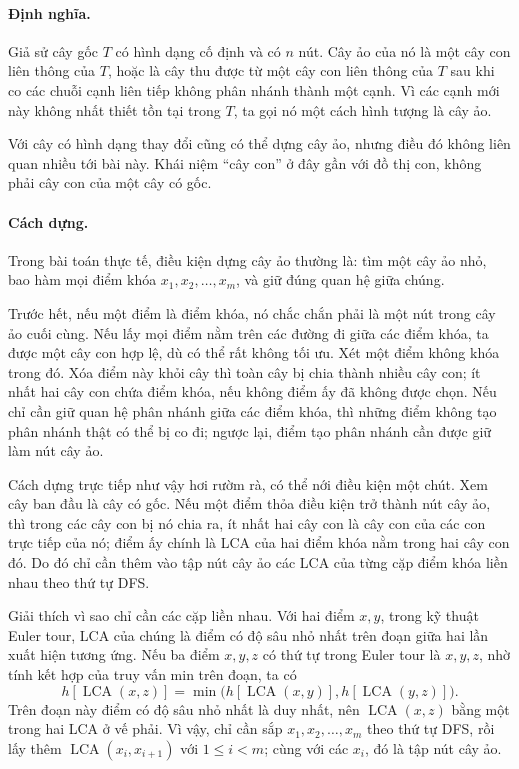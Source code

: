 \documentclass[11pt]{article}
\begin{document}
\paragraph{Định nghĩa.}
Giả sử cây gốc \(T\) có hình dạng cố định và có \(n\) nút. Cây ảo của nó là
một cây con liên thông của \(T\), hoặc là cây thu được từ một cây con liên
thông của \(T\) sau khi co các chuỗi cạnh liên tiếp không phân nhánh thành một
cạnh. Vì các cạnh mới này không nhất thiết tồn tại trong \(T\), ta gọi nó một
cách hình tượng là cây ảo.

Với cây có hình dạng thay đổi cũng có thể dựng cây ảo, nhưng điều đó không
liên quan nhiều tới bài này. Khái niệm ``cây con'' ở đây gần với đồ thị con,
không phải cây con của một cây có gốc.

\paragraph{Cách dựng.}
Trong bài toán thực tế, điều kiện dựng cây ảo thường là: tìm một cây ảo nhỏ,
bao hàm mọi điểm khóa \(x_1,x_2,\ldots,x_m\), và giữ đúng quan hệ giữa chúng.

Trước hết, nếu một điểm là điểm khóa, nó chắc chắn phải là một nút trong cây
ảo cuối cùng. Nếu lấy mọi điểm nằm trên các đường đi giữa các điểm khóa, ta
được một cây con hợp lệ, dù có thể rất không tối ưu. Xét một điểm không khóa
trong đó. Xóa điểm này khỏi cây thì toàn cây bị chia thành nhiều cây con; ít
nhất hai cây con chứa điểm khóa, nếu không điểm ấy đã không được chọn. Nếu chỉ
cần giữ quan hệ phân nhánh giữa các điểm khóa, thì những điểm không tạo phân
nhánh thật có thể bị co đi; ngược lại, điểm tạo phân nhánh cần được giữ làm
nút cây ảo.

Cách dựng trực tiếp như vậy hơi rườm rà, có thể nới điều kiện một chút. Xem
cây ban đầu là cây có gốc. Nếu một điểm thỏa điều kiện trở thành nút cây ảo,
thì trong các cây con bị nó chia ra, ít nhất hai cây con là cây con của các
con trực tiếp của nó; điểm ấy chính là LCA của hai điểm khóa nằm trong hai cây
con đó. Do đó chỉ cần thêm vào tập nút cây ảo các LCA của từng cặp điểm khóa
liền nhau theo thứ tự DFS.

Giải thích vì sao chỉ cần các cặp liền nhau. Với hai điểm \(x,y\), trong kỹ
thuật Euler tour, LCA của chúng là điểm có độ sâu nhỏ nhất trên đoạn giữa hai
lần xuất hiện tương ứng. Nếu ba điểm \(x,y,z\) có thứ tự trong Euler tour là
\(x,y,z\), nhờ tính kết hợp của truy vấn min trên đoạn, ta có
\[
  h[\operatorname{LCA}(x,z)]
  =\min\bigl(h[\operatorname{LCA}(x,y)],
             h[\operatorname{LCA}(y,z)]\bigr).
\]
Trên đoạn này điểm có độ sâu nhỏ nhất là duy nhất, nên
\(\operatorname{LCA}(x,z)\) bằng một trong hai LCA ở vế phải. Vì vậy, chỉ cần
sắp \(x_1,x_2,\ldots,x_m\) theo thứ tự DFS, rồi lấy thêm
\(\operatorname{LCA}(x_i,x_{i+1})\) với \(1\le i<m\); cùng với các
\(x_i\), đó là tập nút cây ảo.
\end{document}
